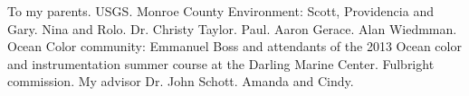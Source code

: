 \documentclass{book}
\let\stdsection\chapter
\renewcommand\chapter{\newpage\stdsection}
\begin{document}
\begin{acknowledgements}
\setlength{\parindent}{20pt}
To my parents. USGS. Monroe County Environment: Scott, Providencia and Gary. Nina and Rolo. Dr. Christy Taylor. Paul. Aaron Gerace. Alan Wiedmman. Ocean Color community: Emmanuel Boss and attendants of the 2013 Ocean color and instrumentation summer course at the Darling Marine Center. Fulbright commission. My advisor Dr. John Schott. Amanda and Cindy.
\end{acknowledgements}

\tableofcontents

\listoffigures
{}

\listoftables
{}




% 
% 
% 
% 

\listoftodos

%
%



\end{document}
